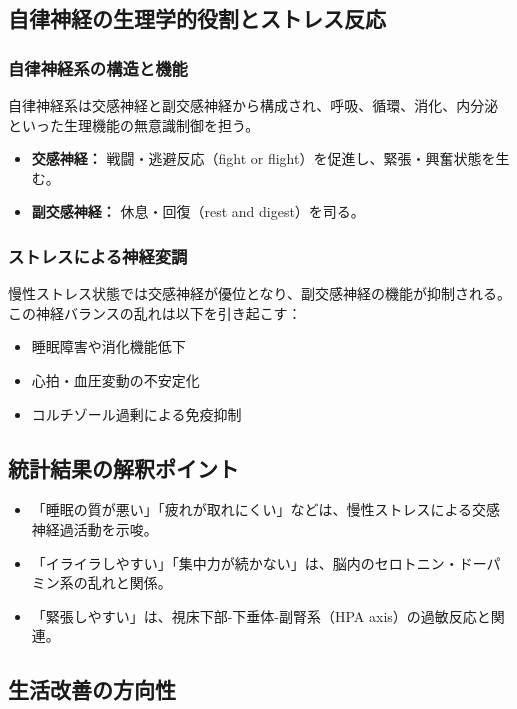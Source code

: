 \documentclass[a4paper,12pt]{article}
\begin{document}
\subsection*{自律神経の生理学的役割とストレス反応}

\subsubsection*{自律神経系の構造と機能}

自律神経系は交感神経と副交感神経から構成され、呼吸、循環、消化、内分泌といった生理機能の無意識制御を担う。

\begin{itemize}
  \item \textbf{交感神経：} 戦闘・逃避反応（fight or flight）を促進し、緊張・興奮状態を生む。
  \item \textbf{副交感神経：} 休息・回復（rest and digest）を司る。
\end{itemize}

\subsubsection*{ストレスによる神経変調}

慢性ストレス状態では交感神経が優位となり、副交感神経の機能が抑制される。この神経バランスの乱れは以下を引き起こす：

\begin{itemize}
  \item 睡眠障害や消化機能低下
  \item 心拍・血圧変動の不安定化
  \item コルチゾール過剰による免疫抑制
\end{itemize}

\subsection*{統計結果の解釈ポイント}

\begin{itemize}
  \item 「睡眠の質が悪い」「疲れが取れにくい」などは、慢性ストレスによる交感神経過活動を示唆。
  \item 「イライラしやすい」「集中力が続かない」は、脳内のセロトニン・ドーパミン系の乱れと関係。
  \item 「緊張しやすい」は、視床下部-下垂体-副腎系（HPA axis）の過敏反応と関連。
\end{itemize}

\subsection*{生活改善の方向性}
\end{document}
